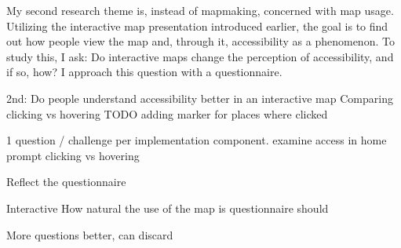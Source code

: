 My second research theme is,
instead of mapmaking, concerned with map usage.
Utilizing the interactive map presentation introduced earlier,
the goal is to find out how people view the map and,
through it, accessibility as a phenomenon.
To study this, I ask:
Do interactive maps change the perception of accessibility, and if so, how?
I approach this question with a questionnaire.

2nd:
Do people understand accessibility better in an interactive map
Comparing clicking vs hovering
TODO adding marker for places where clicked

1 question / challenge per implementation component.
examine access in home 
prompt 
clicking vs hovering

Reflect the questionnaire

Interactive How natural the use of the map is
questionnaire should 



More questions better, can discard



